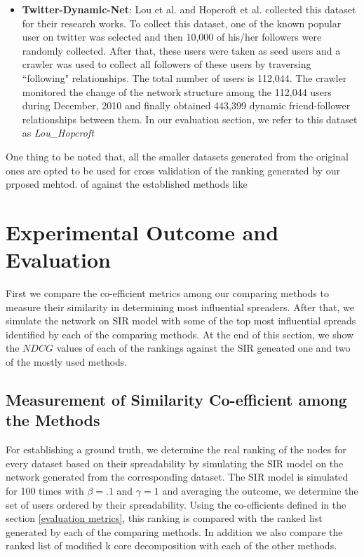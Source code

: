 \documentclass[sigconf]{acmart}
\begin{document}
\begin{itemize}
	\item \textbf{Twitter-Dynamic-Net}: Lou et al. \cite{lou2013learning} and Hopcroft et al. \cite{hopcroft2011will} collected this dataset for their research works. To collect this dataset, one of the known popular user on twitter was selected and then 10,000 of his/her followers were randomly collected. After that, these users were taken as seed users and a crawler was used to collect all followers of these users by traversing ``following" relationships. The total number of users is 112,044. The crawler monitored the change of the network structure among the 112,044 users during December, 2010 and finally obtained 443,399 dynamic friend-follower relationships between them. In our evaluation section, we refer to this dataset as \textit{Lou\_Hopcroft}
	
\end{itemize}

One thing to be noted that, all the smaller datasets generated from the original ones are opted to be used for cross validation of the ranking generated by our prposed mehtod. of against the established methods like 




\section{Experimental Outcome and Evaluation}

First we compare the co-efficient metrics among our comparing methods to measure their similarity in determining most influential spreaders. 
After that, we simulate the network on SIR model with some of the top most influential spreads identified by each of the comparing methods. At the end of this section, we show the $NDCG$ values of each of the rankings against the SIR geneated one and two of the mostly used methods.

\subsection{Measurement of Similarity Co-efficient among the Methods}
For establishing a ground truth, we determine the real ranking of the nodes for every dataset based on their spreadability by simulating the SIR model on the network generated from the corresponding dataset. The SIR model is simulated for 100 times with $\beta=.1$ and $\gamma=1$ and averaging the outcome, we determine the set of users ordered by their  spreadability. Using the co-efficients defined in the section \ref{evaluation metrics}, this ranking is compared with the ranked list generated by each of the comparing methods. In addition we also compare the ranked list of modified k core decomposition with each of the other methods. 
\end{document}
